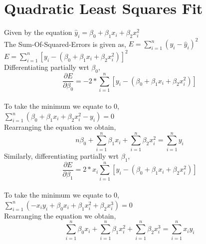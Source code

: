 \documentclass{scrartcl}
\begin{document}
\section*{Quadratic Least Squares Fit}

Given by the equation $\hat y_i=\beta_{0}+\beta_{1}x_{i}+\beta_{2}x_{i}^{2}$\\

The Sum-Of-Squared-Errors is given as, $E=\sum_{i=1}^{n} (y_{i}-\hat y_{i})^{2}$\\

$E=\sum_{i=1}^{n} [y_{i}-(\beta_{0}+\beta_{1}x_{i}+\beta_{2}x_{i}^{2})]^{2}$\\
Differentiating partially wrt $\beta_{0}$,\\

$$ \frac{\partial E}{\partial \beta_{0}}=-2*\sum_{i=1}^{n} [y_{i}-(\beta_{0}+\beta_{1}x_{i}+\beta_{2}x_{i}^{2})] $$\\

To take the minimum we equate to 0,\\

$ \sum_{i=1}^{n}(\beta_0+\beta_1x_{i}+\beta_{2}x_{i}^{2}-y_i)=0$\\

Rearranging the equation we obtain,\\
\begin{equation}
n\beta_{0}+\sum_{i=1}^{n}\beta_{1}x_{i}+\sum_{i=1}^{n}\beta_2x_i^2=\sum_{i=1}^{n}y_{i}
\end{equation}
Similarly, differentiating partially wrt $\beta_{1}$,\\

$$ \frac{\partial E}{\partial \beta_{1}}=2*x_i\sum_{i=1}^{n} [y_{i}-(\beta_{0}+\beta_{1}x_{i}+\beta_2x_i^2)]$$\\

To take the minimum we equate to 0,\\

$ \sum_{i=1}^{n}(-x_iy_{i}+\beta_{0}x_{i}+\beta_{1}x_i^2+\beta_2x_i^3)=0$\\

Rearranging the equation we obtain,\\
\begin{equation}
\sum_{i=1}^{n}\beta_{0}x_{i}+\sum_{i=1}^{n}\beta_{1}x_i^2+\sum_{i=1}^{n}\beta_{2}x_i^3=\sum_{i=1}^{n}x_iy_{i}
\end{equation}
\end{document}
